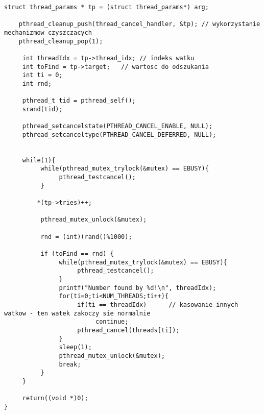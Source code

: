 \documentclass[a4paper,15pt]{article}
\begin{document}
\begin{lstlisting}[style=CStyle, label=some-code, caption=Zadanie 5 - randomsearch.c]
    struct thread_params * tp = (struct thread_params*) arg;

    pthread_cleanup_push(thread_cancel_handler, &tp); // wykorzystanie mechanizmow czyszczacych
    pthread_cleanup_pop(1);

     int threadIdx = tp->thread_idx; // indeks watku
     int toFind = tp->target;   // wartosc do odszukania
     int ti = 0;
     int rnd;
 
     pthread_t tid = pthread_self();
     srand(tid);
 
     pthread_setcancelstate(PTHREAD_CANCEL_ENABLE, NULL);
     pthread_setcanceltype(PTHREAD_CANCEL_DEFERRED, NULL);
    
 
     while(1){
          while(pthread_mutex_trylock(&mutex) == EBUSY){
               pthread_testcancel();
          }
       
         *(tp->tries)++;

          pthread_mutex_unlock(&mutex);
 
          rnd = (int)(rand()%1000);
          
          if (toFind == rnd) {
               while(pthread_mutex_trylock(&mutex) == EBUSY){
                    pthread_testcancel();
               }
               printf("Number found by %d!\n", threadIdx);
               for(ti=0;ti<NUM_THREADS;ti++){
                    if(ti == threadIdx)      // kasowanie innych watkow - ten watek zakoczy sie normalnie
                         continue;
                    pthread_cancel(threads[ti]);
               }
               sleep(1);
               pthread_mutex_unlock(&mutex);
               break;
          }
     }
 
     return((void *)0);
}
\end{lstlisting}
\end{document}
